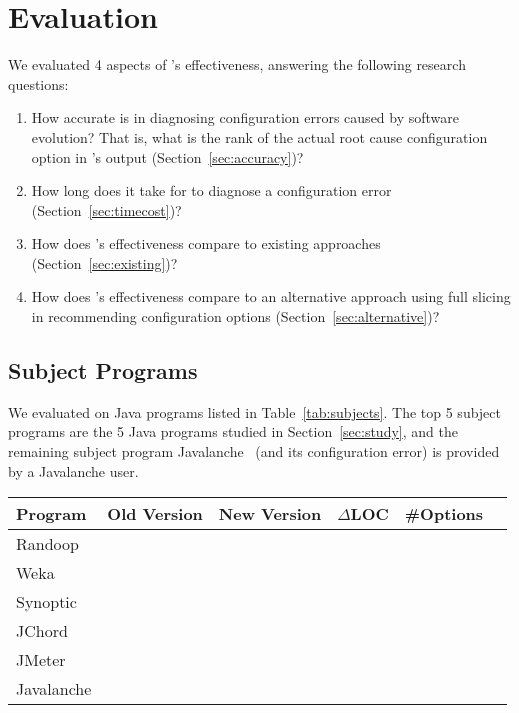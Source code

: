 
\section{Evaluation}
\label{sec:evaluation}

We evaluated 4 aspects of \ourtool's effectiveness, answering
the following research questions:

\begin{enumerate}
\item How accurate is \ourtool in diagnosing configuration errors
caused by software evolution? That is, what is the rank of the
actual root cause configuration option in \ourtool's output (Section~\ref{sec:accuracy})?

\item How long does it take for \ourtool to diagnose
a configuration error (Section~\ref{sec:timecost})?

\item How does \ourtool's effectiveness compare to
existing approaches (Section~\ref{sec:existing})?

\item How does \ourtool's effectiveness compare to
an alternative approach using full slicing in recommending
configuration options (Section~\ref{sec:alternative})?

\end{enumerate}

\subsection{Subject Programs}

We evaluated \ourtool on \subjnum Java programs
listed in Table~\ref{tab:subjects}.
The top 5 subject programs are the 5 Java programs
studied in Section~\ref{sec:study},
and the remaining subject program Javalanche~\cite{javalanche}
(and its configuration error) is provided
by a Javalanche user.


\begin{table}[t]
\vspace{1mm}
\centering
\small{
\setlength{\tabcolsep}{.80\tabcolsep}
\begin{tabular}{|l||c|c|c|c|c|}
\hline
 Program & Old Version & New Version & $\Delta$LOC & \#Options \\
 \hline
 \hline
 Randoop &  &  &&   \\
 Weka &  & & &  \\
 Synoptic &  & & &  \\
 JChord &  & & &  \\
 JMeter &  & & &  \\
 Javalanche &  & & &  \\
\hline
\end{tabular}
}
\vspace{-2mm}
\end{table}

